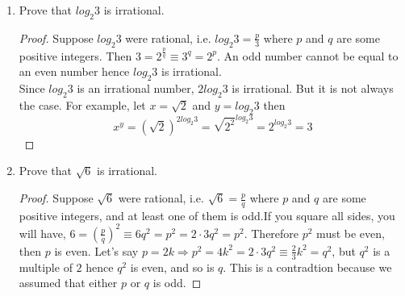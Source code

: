 \documentclass[11pt]{article}
\begin{document}

\section*{}
\begin{enumerate}
    \item  Prove that $log_{2}3$ is irrational.
    \begin{proof}
        Suppose $log_{2}3$ were rational, i.e. $log_{2}3 = \frac{p}{3}$ where $p$ and $q$ are some positive integers. Then $3 = 2^{\frac{p}{q}} \equiv 3^{q} = 2^{p}$. An odd number cannot be equal to an even number hence $log_{2}3$ is irrational. \\

        Since $log_{2}3$ is an irrational number, $2log_{2}3$ is irrational.
        But it is not always the case. For example, let $x = \sqrt{2}$ and $y=log_{2}3$ then
        \begin{equation}
            x^{y} = (\sqrt{2})^{2log_{2}3} = \sqrt{2^{2}}^{log_{2}3} = 2^{log_{2}3} = 3
        \end{equation}
    \end{proof}

    \item Prove that $\sqrt{6}$ is irrational.
    \begin{proof}
        Suppose $\sqrt{6}$ were rational, i.e. $\sqrt{6} = \frac{p}{q}$ where $p$ and $q$ are some positive integers, and at least one of them is odd.If you square all sides, you will have, $ 6 = (\frac{p}{q})^{2} \equiv 6q^{2} = p^{2} = 2\cdot3q^{2} = p^{2}$. Therefore $p^{2}$ must be even, then $p$ is even. Let's say $p=2k \Rightarrow p^{2} = 4k^{2} = 2\cdot 3q^{2} \equiv \frac{2}{3}k^{2} = q^{2}$, but $q^{2}$ is a multiple of $2$ hence $q^{2}$ is even, and so is $q$. This is a contradtion because we assumed that either $p$ or $q$ is odd.
    \end{proof}
\end{enumerate}
\end{document}
